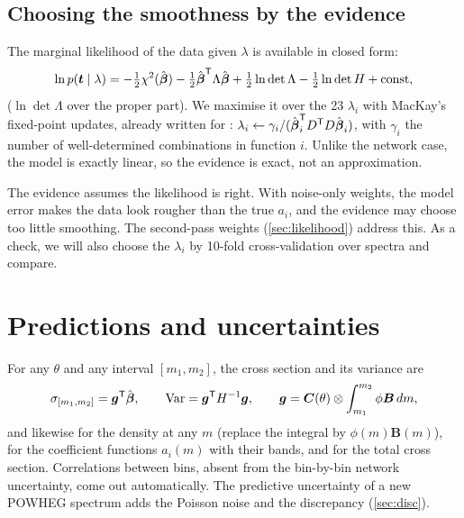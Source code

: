 \subsection{Choosing the smoothness by the evidence}

The marginal likelihood of the data given $\lambda$ is available in closed form:
\begin{equation}
  \ln p(\boldsymbol t\mid\lambda) = -\tfrac12 \chi^2(\hat{\boldsymbol{\beta}}) - \tfrac12
  \hat{\boldsymbol{\beta}}^{\mathsf T}\Lambda\hat{\boldsymbol{\beta}} + \tfrac12\ln\det\Lambda - \tfrac12\ln\det H
  + \text{const},
\end{equation}
($\ln\det\Lambda$ over the proper part). We maximise it over the 23 $\lambda_i$ with MacKay's
fixed-point updates, already written for :
$\lambda_i \leftarrow \gamma_i / (\hat{\boldsymbol{\beta}}_i^{\mathsf T}D^{\mathsf T}D\hat{\boldsymbol{\beta}}_i)$, with
$\gamma_i$ the number of well-determined combinations in function $i$. Unlike the network
case, the model is exactly linear, so the evidence is exact, not an approximation.

\begin{watch}
The evidence assumes the likelihood is right. With noise-only weights, the model error makes
the data look rougher than the true $a_i$, and the evidence may choose too little smoothing.
The second-pass weights (\cref{sec:likelihood}) address this. As a check, we will also choose
the $\lambda_i$ by 10-fold cross-validation over spectra and compare.
\end{watch}

\section{Predictions and uncertainties}

For any $\theta$ and any interval $[m_1, m_2]$, the cross section and its variance are
\begin{equation}
  \sigma_{[m_1,m_2]} = \boldsymbol g^{\mathsf T}\hat{\boldsymbol{\beta}}, \qquad
  \mathrm{Var} = \boldsymbol g^{\mathsf T}H^{-1}\boldsymbol g, \qquad
  \boldsymbol g = \boldsymbol{C}(\theta)\otimes\int_{m_1}^{m_2}\phi\boldsymbol B\,dm ,
\end{equation}
and likewise for the density at any $m$ (replace the integral by $\phi(m)\boldsymbol B(m)$),
for the coefficient functions $a_i(m)$ with their bands, and for the total cross section.
Correlations between bins, absent from the bin-by-bin network uncertainty, come out
automatically. The predictive uncertainty of a new POWHEG spectrum adds the Poisson noise and
the discrepancy (\cref{sec:disc}).

